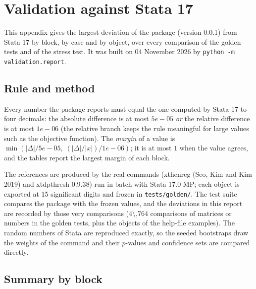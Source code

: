 \clearpage
\providecommand{\vcode}[1]{\texttt{#1}}

\section{Validation against Stata 17}\label{app:validation}
This appendix gives the largest deviation of the package (version 0.0.1) from Stata 17 by
block, by case and by object, over every comparison of the golden tests and of the stress test.
It was built on 04 November 2026 by \vcode{python -m validation.report}.

\subsection{Rule and method}

Every number the package reports must equal the one computed by Stata 17 to four
decimals: the absolute difference is at most $5e-05$ \emph{or} the relative difference is at
most $1e-06$ (the relative branch keeps the rule meaningful for large values such as the
objective function). The \emph{margin} of a value is $\min(|\Delta|/5e-05,\;
(|\Delta|/|x|)/1e-06)$; it is at most $1$ when the value agrees, and the tables report the
largest margin of each block.

The references are produced by the real commands (xthenreg (Seo, Kim and Kim 2019) and xtdpthresh 0.9.38) run in batch with Stata 17.0 MP;
each object is exported at 15 significant digits and frozen in \vcode{tests/golden/}. The test
suite compares the package with the frozen values, and the deviations in this report are recorded
by those very comparisons (4\textbackslash{},764 comparisons of matrices or numbers in the golden tests, plus the
objects of the help-file examples). The random numbers of Stata are reproduced exactly, so the
seeded bootstraps draw the weights of the command and their $p$-values and confidence sets are
compared directly.

\subsection{Summary by block}

